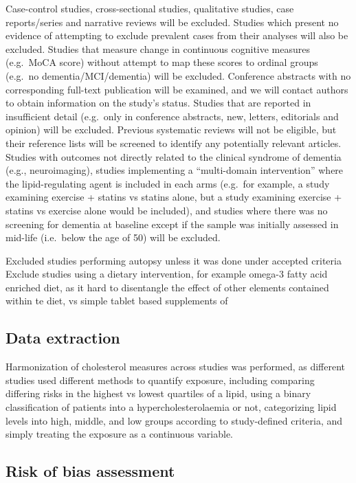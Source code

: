 \documentclass[a4paper, twoside]{templates/ociamthesis}
\begin{document}
Case-control studies, cross-sectional studies, qualitative studies, case reports/series and narrative reviews will be excluded. Studies which present no evidence of attempting to exclude prevalent cases from their analyses will also be excluded. Studies that measure change in continuous cognitive measures (e.g.~MoCA score) without attempt to map these scores to ordinal groups (e.g.~no dementia/MCI/dementia) will be excluded. Conference abstracts with no corresponding full-text publication will be examined, and we will contact authors to obtain information on the study's status. Studies that are reported in insufficient detail (e.g.~only in conference abstracts, new, letters, editorials and opinion) will be excluded. Previous systematic reviews will not be eligible, but their reference lists will be screened to identify any potentially relevant articles. Studies with outcomes not directly related to the clinical syndrome of dementia (e.g., neuroimaging), studies implementing a ``multi-domain intervention'' where the lipid-regulating agent is included in each arms (e.g.~for example, a study examining exercise + statins vs statins alone, but a study examining exercise + statins vs exercise alone would be included), and studies where there was no screening for dementia at baseline except if the sample was initially assessed in mid-life (i.e.~below the age of 50) will be excluded.

Excluded studies performing autopsy unless it was done under accepted criteria
Exclude studies using a dietary intervention, for example omega-3 fatty acid enriched diet, as it hard to disentangle the effect of other elements contained within te diet, vs simple tablet based supplements of

\hypertarget{data-extraction}{%
\subsection{Data extraction}\label{data-extraction}}

Harmonization of cholesterol measures across studies was performed, as different studies used different methods to quantify exposure, including comparing differing risks in the highest vs lowest quartiles of a lipid, using a binary classification of patients into a hypercholesterolaemia or not, categorizing lipid levels into high, middle, and low groups according to study-defined criteria, and simply treating the exposure as a continuous variable.

\hypertarget{risk-of-bias-assessment}{%
\subsection{Risk of bias assessment}\label{risk-of-bias-assessment}}
\end{document}
